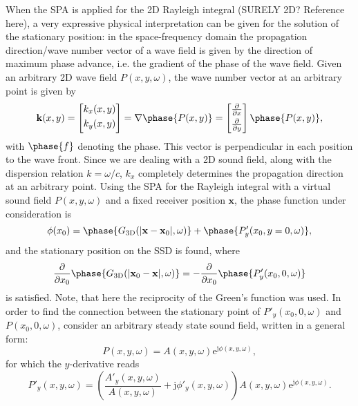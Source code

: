 \documentclass[12pt,a4paper]{article}
\newcommand{\te}{\mathrm{e}}
\newcommand{\ti}{\mathrm{j}}
\newcommand{\vx}{\mathbf{x}}
\newcommand{\vxo}{\mathbf{x}_0}
\begin{document}
When the SPA is applied for the 2D Rayleigh integral (SURELY 2D? Reference here), a very expressive physical interpretation can be given for the solution of the stationary position:
in the space-frequency domain the propagation direction/wave number vector of a wave field is given by the direction of maximum phase advance, i.e. the gradient of the phase of the wave field. Given an arbitrary 2D wave field $P(x,y,\omega)$, the wave number vector at an arbitrary point is given by
\begin{equation}
\mathbf{k}(x,y) = \begin{bmatrix} k_x(x,y) \\[0.3em] k_y(x,y)\\[0.3em]    \end{bmatrix} = \nabla \phase{P(x,y)} = \begin{bmatrix} \frac{\partial}{\partial x} \\[0.3em] \frac{\partial}{\partial y}\\[0.3em] \end{bmatrix}   \phase{P(x,y)},
\end{equation}
with $\phase{f}$ denoting the phase.
This vector is perpendicular in each position to the wave front.
Since we are dealing with a 2D sound field, along with the dispersion relation $k = \omega/c$, $k_x$ completely determines the propagation direction at an arbitrary point.
Using the SPA for the Rayleigh integral with a virtual sound field $P(x,y,\omega)$ and a fixed receiver position $\vx$, the phase function under consideration is 
\begin{equation}
\phi(x_0) =  \phase{G_{\mathrm{3D}}(|\vx-\vxo|,\omega)} + \phase{ P'_y(x_0,y=0,\omega)},
\end{equation}
and the stationary position on the SSD is found, where 
\begin{equation}
\frac{ \partial }{\partial x_0} \phase{G_{\mathrm{3D}}(|\vxo-\vx|,\omega)} = - \frac{ \partial }{\partial x_0} \phase{ P'_y(x_0,0,\omega) }
\end{equation}
is satisfied. Note, that here the reciprocity of the Green's function was used. In order to find the connection between the stationary point of $P'_y(x_0,0,\omega)$ and $P(x_0,0,\omega)$, consider an arbitrary steady state sound field, written in a general form:
\begin{equation}
P(x,y,\omega) = A(x,y,\omega)\te^{\ti \phi(x,y,\omega)},
\end{equation}
for which the $y$-derivative reads
\begin{equation}
P'_y(x,y,\omega) = \left( \frac{A'_y(x,y,\omega)}{A(x,y,\omega)} + \ti \phi'_y(x,y,\omega) \right) A(x,y,\omega)\te^{\ti \phi(x,y,\omega)}.
\end{equation}
\end{document}
